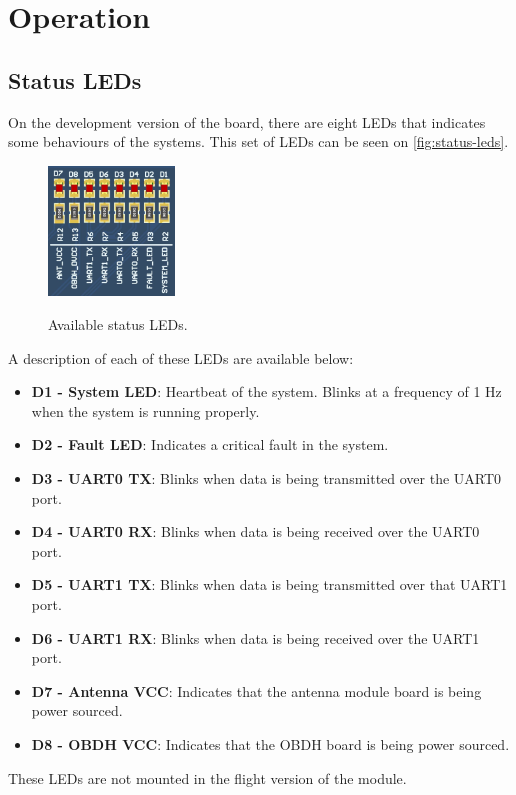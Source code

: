 \section{Operation}

\subsection{Status LEDs} \label{sec:status-leds}

On the development version of the board, there are eight LEDs that indicates some behaviours of the systems. This set of LEDs can be seen on \autoref{fig:status-leds}.

\begin{figure}[!ht]
    \begin{center}
        \includegraphics[width=0.3\textwidth]{figures/status_leds.png}
        \label{fig:status-leds}
        \caption{Available status LEDs.}
    \end{center}
\end{figure}

A description of each of these LEDs are available below:

\begin{itemize}
    \item \textbf{D1 - System LED}: Heartbeat of the system. Blinks at a frequency of 1 Hz when the system is running properly.
    \item \textbf{D2 - Fault LED}: Indicates a critical fault in the system.
    \item \textbf{D3 - UART0 TX}: Blinks when data is being transmitted over the UART0 port.
    \item \textbf{D4 - UART0 RX}: Blinks when data is being received over the UART0 port.
    \item \textbf{D5 - UART1 TX}: Blinks when data is being transmitted over that UART1 port.
    \item \textbf{D6 - UART1 RX}: Blinks when data is being received over the UART1 port.
    \item \textbf{D7 - Antenna VCC}: Indicates that the antenna module board is being power sourced.
    \item \textbf{D8 - OBDH VCC}: Indicates that the OBDH board is being power sourced.
\end{itemize}

These LEDs are not mounted in the flight version of the module.
